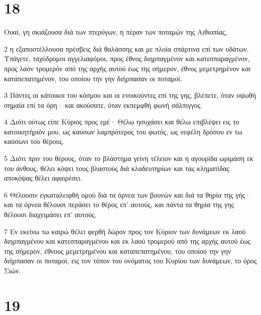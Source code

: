 \chapter{18}

\par Ουαί, γη σκιάζουσα διά των πτερύγων, η πέραν των ποταμών της Αιθιοπίας,
\par 2 η εξαποστέλλουσα πρέσβεις διά θαλάσσης και με πλοία σπάρτινα επί των υδάτων. Υπάγετε, ταχύδρομοι αγγελιαφόροι, προς έθνος διηρπαγμένον και κατεσπαραγμένον, προς λαόν τρομερόν από της αρχής αυτού έως της σήμερον, έθνος μεμετρημένον και καταπεπατημένον, του οποίου την γην διήρπασαν οι ποταμοί.
\par 3 Πάντες οι κάτοικοι του κόσμου και οι ενοικούντες επί της γης, βλέπετε, όταν υψωθή σημαία επί τα όρη· και ακούσατε, όταν εκπεμφθή φωνή σάλπιγγος.
\par 4 Διότι ούτως είπε Κύριος προς εμέ· Θέλω ησυχάσει και θέλω επιβλέψει εις το κατοικητήριόν μου, ως καύσων λαμπρότερος του φωτός, ως νεφέλη δρόσου εν τω καύσωνι του θέρους.
\par 5 Διότι πριν του θέρους, όταν το βλάστημα γείνη τέλειον και η αγουρίδα ωριμάση εκ του άνθους, θέλει κόψει τους βλαστούς διά κλαδευτηρίων και τας κληματίδας αποκόψας θέλει αφαιρέσει.
\par 6 Θέλουσιν εγκαταλειφθή ομού διά τα όρνεα των βουνών και διά τα θηρία της γής· και τα όρνεα θέλουσι περάσει το θέρος επ' αυτούς, και πάντα τα θηρία της γης θέλουσι διαχειμάσει επ' αυτούς.
\par 7 Εν εκείνω τω καιρώ θέλει φερθή δώρον προς τον Κύριον των δυνάμεων εκ λαού διηρπαγμένου και κατεσπαραγμένου και εκ λαού τρομερού από της αρχής αυτού έως της σήμερον, έθνους μεμετρημένου και καταπεπατημένου, του οποίου την γην διήρπασαν οι ποταμοί, εις τον τόπον του ονόματος του Κυρίου των δυνάμεων, το όρος Σιών.

\chapter{19}


